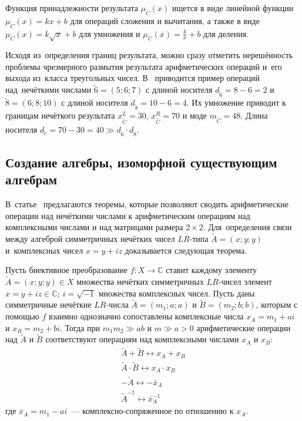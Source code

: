 Функция принадлежности результата $\mu_{\tilde C}\left( x \right)$ ищется в виде линейной функции $\mu_{\tilde C}\left( x \right)=kx+b$ для операций сложения и вычитания, а также в виде $\mu_{\tilde C}\left( x \right)=k\sqrt{x}+b$ для умножения и $\mu_{\tilde C}\left( x \right)=\frac{k}{x}+b$ для деления.

Исходя из~определения границ результата, можно сразу отметить нерешённость проблемы чрезмерного размытия результата арифметических операций и~его выхода из~класса треугольных чисел. В~\cite{Borisov_Krumberg_Riga} приводится пример операций над~нечёткими числами $\tilde{6}=\left( 5;6;7 \right)$ с длиной носителя ${{d}_{{\tilde{6}}}}=8-6=2$ и $\tilde{8}=\left( 6;8;10 \right)$ с длиной носителя ${{d}_{{\tilde{8}}}}=10-6=4$. Их умножение приводит к границам нечёткого результата $x_{{\tilde{C}}}^{L}=30$, $x_{{\tilde{C}}}^{R}=70$ и моде ${{m}_{{\tilde{C}}}}=48$. Длина носителя ${{d}_{{\tilde{c}}}}=70-30=40\gg {{d}_{{\tilde{6}}}}\cdot {{d}_{{\tilde{8}}}}$.

\subsection{Создание алгебры, изоморфной существующим алгебрам}
В~статье~\cite{Uskov_Complex} предлагаются теоремы, которые позволяют сводить арифметические операции над нечёткими числами к арифметическим операциям над комплексными числами и над матрицами размера $2\times 2$. Для~определения связи между алгеброй симметричных нечётких чисел $LR$-типа $\tilde{A}=\left( x;y;y \right)$ и~комплексных чисел $x=y+iz$ доказывается следующая теорема.

\begin{theorem}
Пусть биективное преобразование $f:X\to \mathbb{C}$ ставит каждому элементу $\tilde{A}=\left( x;y;y \right)\in X$ множества нечётких симметричных $LR$-чисел элемент $x=y+iz\in \mathbb{C};\ i=\sqrt{-1}$ множества комплексных чисел. Пусть даны симметричные нечёткие $LR$-числа $\tilde{A}=\left( {{m}_{1}};a;a \right)$ и $\tilde{B}=\left( {{m}_{2}};b;b \right)$, которым с помощью $f$ взаимно однозначно сопоставлены комплексные числа $x_A=m_1+ai$ и $x_B=m_2+bi$. Тогда при ${{m}_{1}}{{m}_{2}}\gg ab$ и $m\gg a>0$ арифметические операции над $\tilde A$ и $\tilde B$ соответствуют операциям над комплексными числами ${{x}_{A}}$ и ${{x}_{B}}$:
\begin{gather*}
	\tilde{A}+\tilde{B}\leftrightarrow {{x}_{A}}+{{x}_{B}} \\ 
	\tilde{A}\cdot \tilde{B}\leftrightarrow {{x}_{A}}\cdot {{x}_{B}} \\ 
	-\tilde{A}\leftrightarrow -{{{\bar{x}}}_{A}} \\ 
  	{{{\tilde{A}}}^{-1}}\leftrightarrow \bar{x}_{A}^{-1} 
\end{gather*}
где ${{\bar{x}}_{A}}={{m}_{1}}-ai$~--- комплексно-сопряженное по отношению к $x_A$.
\end{theorem}

